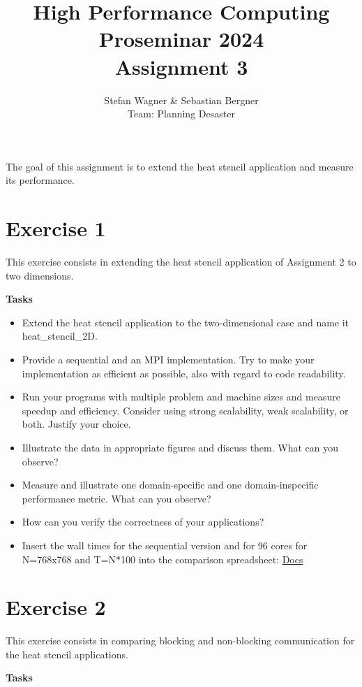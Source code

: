 \documentclass[UTF-8]{article}
\title{High Performance Computing Proseminar 2024 \\
    \large Assignment 3} %
\author{Stefan Wagner \& Sebastian Bergner\\Team: Planning Desaster}
\begin{document}
    
    \maketitle
    
    The goal of this assignment is to extend the heat stencil application and measure its performance. 
    
    \section*{Exercise 1}
    This exercise consists in extending the heat stencil application of Assignment 2 to two dimensions. 
    
    \textbf{Tasks}
    
    
    \begin{itemize}
    	\item Extend the heat stencil application to the two-dimensional case and name it heat\_stencil\_2D.
    	\item Provide a sequential and an MPI implementation. Try to make your implementation as efficient as possible, also with regard to code
    	readability.
    	\item Run your programs with multiple problem and machine sizes and measure speedup and efficiency. Consider using strong scalability, weak
    	scalability, or both. Justify your choice.
    	\item Illustrate the data in appropriate figures and discuss them. What can you observe?
    	\item Measure and illustrate one domain-specific and one domain-inspecific performance metric. What can you observe?
    	\item How can you verify the correctness of your applications?
    	\item Insert the wall times for the sequential version and for 96 cores for N=768x768 and T=N*100 into the comparison spreadsheet: \href{https://docs.google.com/spreadsheets/d/1p6d9F12EtykmI2-7MnHkg0U15UAtaCvWz8Ip92ZEsWo}{Docs}
    \end{itemize}
    
    \section*{Exercise 2}
    
    This exercise consists in comparing blocking and non-blocking communication for the heat stencil applications. 
    
    \textbf{Tasks}
    
\end{document}
